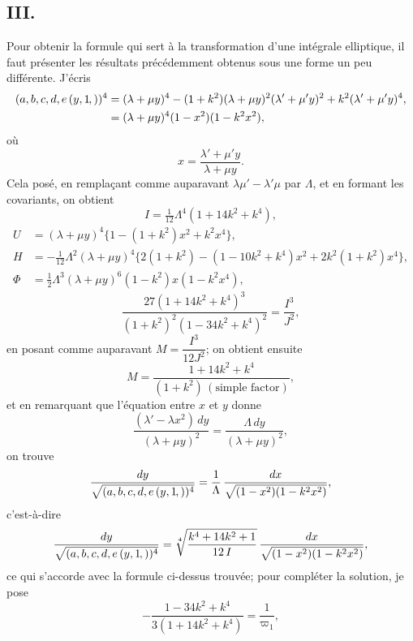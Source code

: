 \documentclass[11pt,a4paper]{article}
\newcommand{\fcn}[2]{(#1\kern-1pt, #2)}
\begin{document}
\setcounter{page}{67}

\subsection*{III.}

Pour obtenir la formule qui sert \`a la transformation d'une int\'egrale elliptique,
il faut pr\'esenter les r\'esultats pr\'ec\'edemment obtenus sous une forme un peu
diff\'erente. J'\'ecris
\begin{align*}
(a,b,c,d,e\,\fcn{y,1})^4 &= (\lambda + \mu y)^4 - (1 + k^2)(\lambda + \mu y)^2(\lambda' + \mu' y)^2 + k^2(\lambda' + \mu' y)^4,\\
&= (\lambda + \mu y)^4 (1 - x^2)(1 - k^2 x^2),
\end{align*}
o\`u
\[
x = \frac{\lambda' + \mu' y}{\lambda + \mu y}.
\]
Cela pos\'e, en rempla\c{c}ant comme auparavant $\lambda\mu' - \lambda'\mu$ par
$\Lambda$, et en formant les covariants, on obtient
\[
I = \tfrac{1}{12}\Lambda^4 (1 + 14 k^2 + k^4),
\]
\begin{align*}
U &= (\lambda + \mu y)^4 \{1 - (1 + k^2) x^2 + k^2 x^4\},\\
H &= -\tfrac{1}{12}\Lambda^2 (\lambda + \mu y)^4 \{2(1 + k^2) - (1 - 10 k^2 + k^4) x^2 + 2 k^2(1 + k^2) x^4\},\\
\Phi &= \tfrac{1}{2}\Lambda^3 (\lambda + \mu y)^6 (1 - k^2) x (1 - k^2 x^4),
\end{align*}
\[
\frac{27 (1 + 14 k^2 + k^4)^3}{(1 + k^2)^2 (1 - 34 k^2 + k^4)^2} = \frac{I^3}{J^2},
\]
en posant comme auparavant $M = \dfrac{I^3}{12 J^2}$; on obtient ensuite
\[
M = \frac{1 + 14 k^2 + k^4}{(1 + k^2)\,(\text{simple factor})},
\]
et en remarquant que l'\'equation entre $x$ et $y$ donne
\[
\frac{(\lambda' - \lambda x^2)\,dy}{(\lambda + \mu y)^2} = \frac{\Lambda \,dy}{(\lambda + \mu y)^2},
\]
on trouve
\[
\frac{dy}{\sqrt{(a,b,c,d,e\,\fcn{y,1})^4}} = \frac{1}{\Lambda}\,\frac{dx}{\sqrt{(1 - x^2)(1 - k^2 x^2)}},
\]
c'est-\`a-dire
\[
\frac{dy}{\sqrt{(a,b,c,d,e\,\fcn{y,1})^4}} = \sqrt[4]{\frac{k^4 + 14 k^2 + 1}{12\,I}}\,\frac{dx}{\sqrt{(1 - x^2)(1 - k^2 x^2)}},
\]
ce qui s'accorde avec la formule ci-dessus trouv\'ee; pour compl\'eter la solution,
je pose
\[
-\frac{1 - 34 k^2 + k^4}{3(1 + 14 k^2 + k^4)} = \frac{1}{\varpi_1},
\]

\setcounter{page}{68}
\end{document}

